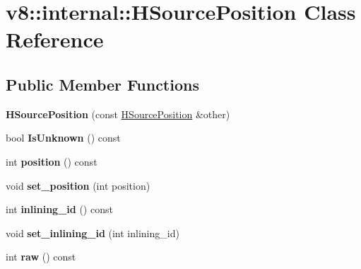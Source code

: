 \hypertarget{classv8_1_1internal_1_1_h_source_position}{}\section{v8\+:\+:internal\+:\+:H\+Source\+Position Class Reference}
\label{classv8_1_1internal_1_1_h_source_position}
\subsection*{Public Member Functions}
\begin{DoxyCompactItemize}
\item 
\hypertarget{classv8_1_1internal_1_1_h_source_position_abb45077ddb8aa51030c14252afd096ec}{}{\bfseries H\+Source\+Position} (const \hyperlink{classv8_1_1internal_1_1_h_source_position}{H\+Source\+Position} \&other)\label{classv8_1_1internal_1_1_h_source_position_abb45077ddb8aa51030c14252afd096ec}

\item 
\hypertarget{classv8_1_1internal_1_1_h_source_position_ab4fcf4b61d1cf50e07358e27dbe14769}{}bool {\bfseries Is\+Unknown} () const \label{classv8_1_1internal_1_1_h_source_position_ab4fcf4b61d1cf50e07358e27dbe14769}

\item 
\hypertarget{classv8_1_1internal_1_1_h_source_position_a9a6eb80e059dcb26edc46919cd771251}{}int {\bfseries position} () const \label{classv8_1_1internal_1_1_h_source_position_a9a6eb80e059dcb26edc46919cd771251}

\item 
\hypertarget{classv8_1_1internal_1_1_h_source_position_a7256f591fde12c8427e24e1d4afd5116}{}void {\bfseries set\+\_\+position} (int position)\label{classv8_1_1internal_1_1_h_source_position_a7256f591fde12c8427e24e1d4afd5116}

\item 
\hypertarget{classv8_1_1internal_1_1_h_source_position_a2fb74c096fc09fef60a8a0f2ff407029}{}int {\bfseries inlining\+\_\+id} () const \label{classv8_1_1internal_1_1_h_source_position_a2fb74c096fc09fef60a8a0f2ff407029}

\item 
\hypertarget{classv8_1_1internal_1_1_h_source_position_ab9ff9d85f0b0d977eed82d3b9a41aaf4}{}void {\bfseries set\+\_\+inlining\+\_\+id} (int inlining\+\_\+id)\label{classv8_1_1internal_1_1_h_source_position_ab9ff9d85f0b0d977eed82d3b9a41aaf4}

\item 
\hypertarget{classv8_1_1internal_1_1_h_source_position_a5b84a2e364db2d2e91704f32e95236c3}{}int {\bfseries raw} () const \label{classv8_1_1internal_1_1_h_source_position_a5b84a2e364db2d2e91704f32e95236c3}

\end{DoxyCompactItemize}
